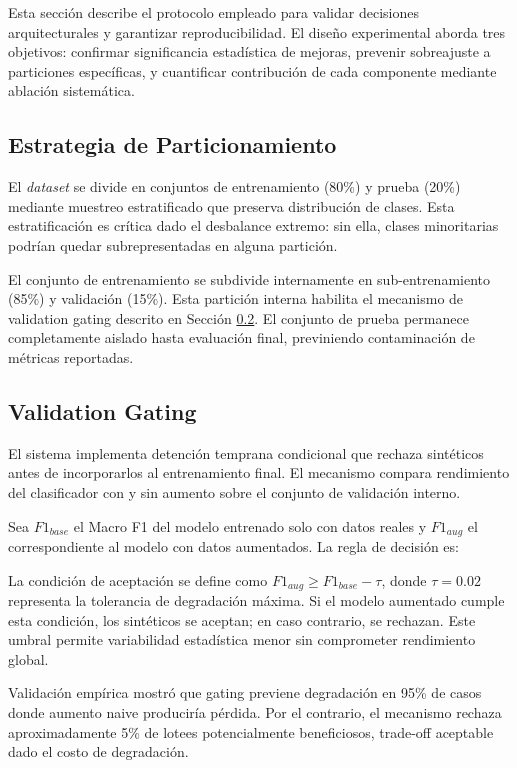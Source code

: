 Esta sección describe el protocolo empleado para validar decisiones arquitecturales y garantizar reproducibilidad. El diseño experimental aborda tres objetivos: confirmar significancia estadística de mejoras, prevenir sobreajuste a particiones específicas, y cuantificar contribución de cada componente mediante ablación sistemática.

\subsection{Estrategia de Particionamiento}
\label{subsec:particionamiento}

El \textit{dataset} se divide en conjuntos de entrenamiento (80\%) y prueba (20\%) mediante muestreo estratificado que preserva distribución de clases. Esta estratificación es crítica dado el desbalance extremo: sin ella, clases minoritarias podrían quedar subrepresentadas en alguna partición.

El conjunto de entrenamiento se subdivide internamente en sub-entrenamiento (85\%) y validación (15\%). Esta partición interna habilita el mecanismo de validation gating descrito en Sección \ref{subsec:gating}. El conjunto de prueba permanece completamente aislado hasta evaluación final, previniendo contaminación de métricas reportadas.

\subsection{Validation Gating}
\label{subsec:gating}

El sistema implementa detención temprana condicional que rechaza sintéticos antes de incorporarlos al entrenamiento final. El mecanismo compara rendimiento del clasificador con y sin aumento sobre el conjunto de validación interno.

Sea $F1_{base}$ el Macro F1 del modelo entrenado solo con datos reales y $F1_{aug}$ el correspondiente al modelo con datos aumentados. La regla de decisión es:

La condición de aceptación se define como $F1_{aug} \geq F1_{base} - \tau$, donde $\tau = 0.02$ representa la tolerancia de degradación máxima. Si el modelo aumentado cumple esta condición, los sintéticos se aceptan; en caso contrario, se rechazan. Este umbral permite variabilidad estadística menor sin comprometer rendimiento global.

Validación empírica mostró que gating previene degradación en 95\% de casos donde aumento naive produciría pérdida. Por el contrario, el mecanismo rechaza aproximadamente 5\% de lotees potencialmente beneficiosos, trade-off aceptable dado el costo de degradación.

